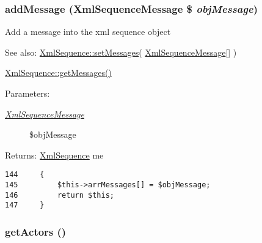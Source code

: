 \hypertarget{class_xml_sequence_a93046205800334868fc8aa3294a609e}{
\subsubsection[{addMessage}]{\setlength{\rightskip}{0pt plus 5cm}addMessage ({\bf XmlSequenceMessage} \$ {\em objMessage})}}
\label{class_xml_sequence_a93046205800334868fc8aa3294a609e}


Add a message into the xml sequence object

\begin{Desc}
\item[See also:]\hyperlink{class_xml_sequence_f0c179f1eb00eaaafb9d18f7a330b86f}{XmlSequence::setMessages}( \hyperlink{class_xml_sequence_message}{XmlSequenceMessage}\mbox{[}\mbox{]} ) 

\hyperlink{class_xml_sequence_7347b0b89cca1d7604e93f5b5e896fc4}{XmlSequence::getMessages()} \end{Desc}
\begin{Desc}
\item[Parameters:]
\begin{description}
\item[{\em \hyperlink{class_xml_sequence_message}{XmlSequenceMessage}}]\$objMessage \end{description}
\end{Desc}
\begin{Desc}
\item[Returns:]\hyperlink{class_xml_sequence}{XmlSequence} me \end{Desc}


\begin{Code}\begin{verbatim}144     {
145         $this->arrMessages[] = $objMessage;
146         return $this;
147     }
\end{verbatim}
\end{Code}


\hypertarget{class_xml_sequence_c5620e43921e5f05c953d7afd78b6bcd}{
\subsubsection[{getActors}]{\setlength{\rightskip}{0pt plus 5cm}getActors ()}}
\label{class_xml_sequence_c5620e43921e5f05c953d7afd78b6bcd}


